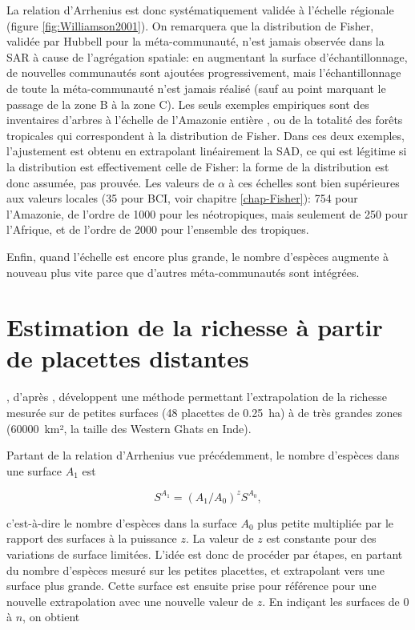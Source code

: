 \documentclass[
  11pt,
  french,
  a4paper,
  extrafontsizes,onecolumn,openright
  ]{memoir}
\newlength{\rf}
\begin{document}
La relation d'Arrhenius est donc systématiquement validée à l'échelle régionale (figure \ref{fig:Williamson2001}).
On remarquera que la distribution de Fisher, validée par Hubbell pour la méta-communauté, n'est jamais observée dans la SAR à cause de l'agrégation spatiale: en augmentant la surface d'échantillonnage, de nouvelles communautés sont ajoutées progressivement, mais l'échantillonnage de toute la méta-communauté n'est jamais réalisé (sauf au point marquant le passage de la zone B à la zone C).
Les seuls exemples empiriques sont des inventaires d'arbres à l'échelle de l'Amazonie entière \autocite{TerSteege2013}, ou de la totalité des forêts tropicales \autocite{Slik2015} qui correspondent à la distribution de Fisher. Dans ces deux exemples, l'ajustement est obtenu en extrapolant linéairement la SAD, ce qui est légitime \autocite{Izsak2012} si la distribution est effectivement celle de Fisher: la forme de la distribution est donc assumée, pas prouvée.
Les valeurs de \(\alpha\) à ces échelles sont bien supérieures aux valeurs locales (35 pour BCI, voir chapitre \ref{chap-Fisher}): 754 pour l'Amazonie, de l'ordre de 1000 pour les néotropiques, mais seulement de 250 pour l'Afrique, et de l'ordre de 2000 pour l'ensemble des tropiques.

Enfin, quand l'échelle est encore plus grande, le nombre d'espèces augmente à nouveau plus vite parce que d'autres méta-communautés sont intégrées.

\section{Estimation de la richesse à partir de placettes distantes}\label{estimation-de-la-richesse-uxe0-partir-de-placettes-distantes}

\textcite{Krishnamani2004}, d'après \textcite{Harte1999}, développent une méthode permettant l'extrapolation de la richesse mesurée sur de petites surfaces (48 placettes de 0.25~ha) à de très grandes zones (60000~km², la taille des Western Ghats en Inde).

Partant de la relation d'Arrhenius vue précédemment, le nombre d'espèces dans une surface \(A_1\) est

\begin{equation}
  \label{eq:NsA1}
  S^{A_1} = \left({A_1}/{A_0}\right)^z{S^{A_0}},
\end{equation}

c'est-à-dire le nombre d'espèces dans la surface \(A_0\) plus petite multipliée par le rapport des surfaces à la puissance \(z\).
La valeur de \(z\) est constante pour des variations de surface limitées.
L'idée est donc de procéder par étapes, en partant du nombre d'espèces mesuré sur les petites placettes, et extrapolant vers une surface plus grande.
Cette surface est ensuite prise pour référence pour une nouvelle extrapolation avec une nouvelle valeur de \(z\).
En indiçant les surfaces de 0 à \(n\), on obtient
\end{document}
